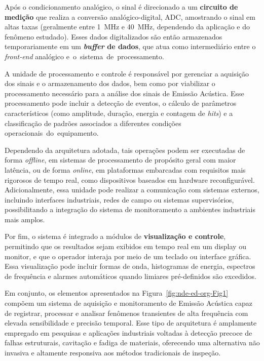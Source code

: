 Após o condicionamento analógico, o sinal é direcionado a um \textbf{circuito de medição} que realiza a conversão analógico-digital, ADC, amostrando o sinal em altas taxas (geralmente entre 1~MHz e 40~MHz, dependendo da aplicação e do fenômeno estudado). Esses dados digitalizados são então armazenados temporariamente em um \textbf{\textit{buffer} de dados}, que atua como intermediário entre o \textit{front-end} analógico \mbox{e o sistema de processamento}.

A unidade de processamento e controle é responsável por gerenciar a aquisição dos
sinais e o armazenamento dos dados, bem como por viabilizar o processamento
necessário para a análise dos sinais de Emissão Acústica. Esse processamento pode
incluir a detecção de eventos, o cálculo de parâmetros característicos (como
amplitude, duração, energia e contagem de \textit{hits}) e a classificação de
padrões associados a diferentes condições \mbox{operacionais do equipamento.}

Dependendo da arquitetura adotada, tais operações podem ser executadas de forma
\textit{offline}, em sistemas de processamento de propósito geral com maior
latência, ou de forma \textit{online}, em plataformas embarcadas com requisitos
mais rigorosos de tempo real, como dispositivos baseados em hardware
reconfigurável. Adicionalmente, essa unidade pode realizar a comunicação com
sistemas externos, incluindo interfaces industriais, redes de campo ou sistemas
supervisórios, possibilitando a integração do sistema de monitoramento a
ambientes industriais mais amplos.

Por fim, o sistema é integrado a módulos de \textbf{visualização e controle}, permitindo que os resultados sejam exibidos em tempo real em um display ou monitor, e que o operador interaja por meio de um teclado ou interface gráfica. Essa visualização pode incluir formas de onda, histogramas de energia, espectros de frequência e alarmes automáticos quando limiares pré-definidos são excedidos.

Em conjunto, os elementos apresentados na Figura~\ref{fig:nde-ed-org-Fig1} compõem um sistema de aquisição e monitoramento de Emissão Acústica capaz de registrar, processar e analisar fenômenos transientes de alta frequência com elevada sensibilidade e precisão temporal. Esse tipo de arquitetura é amplamente empregado em pesquisas e aplicações industriais voltadas à detecção precoce de falhas estruturais, cavitação e fadiga de materiais, oferecendo uma alternativa não invasiva e altamente responsiva aos métodos tradicionais de inspeção.

